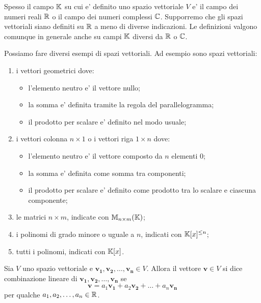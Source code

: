 Spesso il campo $\mathbb{K}$ su cui e' definito uno spazio vettoriale $V$ e' il campo dei numeri reali $\mathbb{R}$ o il campo dei numeri complessi $\mathbb{C}$. Supporremo che gli spazi vettoriali siano definiti su $\mathbb{R}$ a meno di diverse indicazioni. Le definizioni valgono comunque in generale anche su campi $\mathbb{K}$ diversi da $\mathbb{R}$ o $\mathbb{C}$.

\begin{example}
    Possiamo fare diversi esempi di spazi vettoriali. Ad esempio sono spazi vettoriali:
    \begin{enumerate}
        \item i vettori geometrici dove:
        \begin{itemize}
            \item l'elemento neutro e' il vettore nullo;
            \item la somma e' definita tramite la regola del parallelogramma;
            \item il prodotto per scalare e' definito nel modo usuale;
        \end{itemize}
        \item i vettori colonna $n \times 1$ o i vettori riga $1 \times n$ dove:
        \begin{itemize}
            \item l'elemento neutro e' il vettore composto da $n$ elementi $0$;
            \item la somma e' definita come somma tra componenti;
            \item il prodotto per scalare e' definito come prodotto tra lo scalare e ciascuna componente;
        \end{itemize}
        \item le matrici $n \times m$, indicate con $\mathbb{M}_{n \times m}(\mathbb{K})$;
        \item i polinomi di grado minore o uguale a $n$, indicati con $\mathbb{K}[x]^{\leq n}$;
        \item tutti i polinomi, indicati con $\mathbb{K}[x]$.
    \end{enumerate}
\end{example}

\begin{definition}
    Sia $V$ uno spazio vettoriale e $\bm{v_1}, \bm{v_2}, \dots, \bm{v_n} \in V$. Allora il vettore $\bm{v} \in V$ si dice combinazione lineare di $\bm{v_1}, \bm{v_2}, \dots, \bm{v_n}$ se 
    \begin{equation}
        \bm{v}= a_1\bm{v_1} + a_2\bm{v_2} + \dots + a_n\bm{v_n} 
    \end{equation}
    per qualche $a_1, a_2, \dots, a_n \in \mathbb{R}$.
\end{definition}


